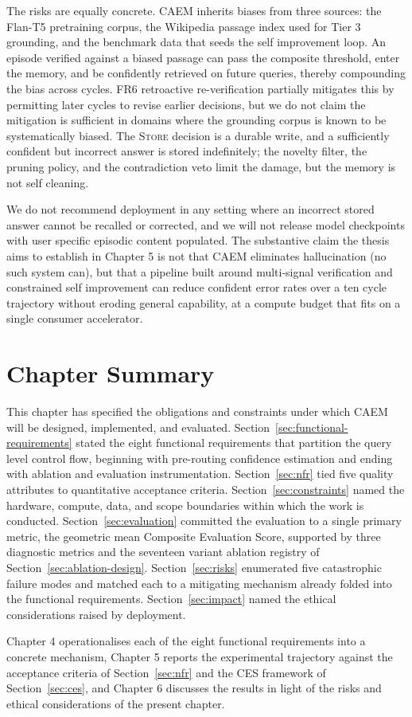The risks are equally concrete. CAEM inherits biases from three sources: the Flan-T5 pretraining corpus, the Wikipedia passage index used for Tier 3 grounding, and the benchmark data that seeds the self improvement loop. An episode verified against a biased passage can pass the composite threshold, enter the memory, and be confidently retrieved on future queries, thereby compounding the bias across cycles. FR6 retroactive re-verification partially mitigates this by permitting later cycles to revise earlier decisions, but we do not claim the mitigation is sufficient in domains where the grounding corpus is known to be systematically biased. The \textsc{Store} decision is a durable write, and a sufficiently confident but incorrect answer is stored indefinitely; the novelty filter, the pruning policy, and the contradiction veto limit the damage, but the memory is not self cleaning.

We do not recommend deployment in any setting where an incorrect stored answer cannot be recalled or corrected, and we will not release model checkpoints with user specific episodic content populated. The substantive claim the thesis aims to establish in Chapter 5 is not that CAEM eliminates hallucination (no such system can), but that a pipeline built around multi-signal verification and constrained self improvement can reduce confident error rates over a ten cycle trajectory without eroding general capability, at a compute budget that fits on a single consumer accelerator.

\section{Chapter Summary}
\label{sec:ch3-summary}

This chapter has specified the obligations and constraints under which CAEM will be designed, implemented, and evaluated. Section~\ref{sec:functional-requirements} stated the eight functional requirements that partition the query level control flow, beginning with pre-routing confidence estimation and ending with ablation and evaluation instrumentation. Section~\ref{sec:nfr} tied five quality attributes to quantitative acceptance criteria. Section~\ref{sec:constraints} named the hardware, compute, data, and scope boundaries within which the work is conducted. Section~\ref{sec:evaluation} committed the evaluation to a single primary metric, the geometric mean Composite Evaluation Score, supported by three diagnostic metrics and the seventeen variant ablation registry of Section~\ref{sec:ablation-design}. Section~\ref{sec:risks} enumerated five catastrophic failure modes and matched each to a mitigating mechanism already folded into the functional requirements. Section~\ref{sec:impact} named the ethical considerations raised by deployment.

Chapter 4 operationalises each of the eight functional requirements into a concrete mechanism, Chapter 5 reports the experimental trajectory against the acceptance criteria of Section~\ref{sec:nfr} and the CES framework of Section~\ref{sec:ces}, and Chapter 6 discusses the results in light of the risks and ethical considerations of the present chapter.
